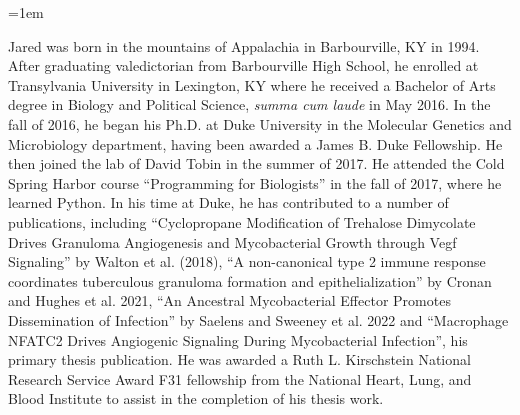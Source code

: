 \documentclass[PhD]{dukethesis2006}
\begin{document}
%

% 

\emergencystretch=1em
\printbibliography[category=cited, heading=bibintoc]

	
\biography

\begin{doublespace}

Jared was born in the mountains of Appalachia in Barbourville, KY in 1994. After graduating valedictorian from Barbourville High School, he enrolled at Transylvania University in Lexington, KY where he received a Bachelor of Arts degree in Biology and Political Science, \textit{summa cum laude} in May 2016. In the fall of 2016, he began his Ph.D. at Duke University in the Molecular Genetics and Microbiology department, having been awarded a James B. Duke Fellowship. He then joined the lab of David Tobin in the summer of 2017. He attended the Cold Spring Harbor course ``Programming for Biologists'' in the fall of 2017, where he learned Python. In his time at Duke, he has contributed to a number of publications, including ``Cyclopropane Modification of Trehalose Dimycolate Drives Granuloma Angiogenesis and Mycobacterial Growth through Vegf Signaling'' by Walton et al. (2018), ``A non-canonical type 2 immune response coordinates tuberculous granuloma formation and epithelialization'' by Cronan and Hughes et al. 2021, ``An Ancestral Mycobacterial Effector Promotes Dissemination of Infection'' by Saelens and Sweeney et al. 2022 and ``Macrophage NFATC2 Drives Angiogenic Signaling During Mycobacterial Infection'', his primary thesis publication. He was awarded a Ruth L. Kirschstein National Research Service Award F31 fellowship from the National Heart, Lung, and Blood Institute to assist in the completion of his thesis work.

\end{doublespace}
\end{document}
